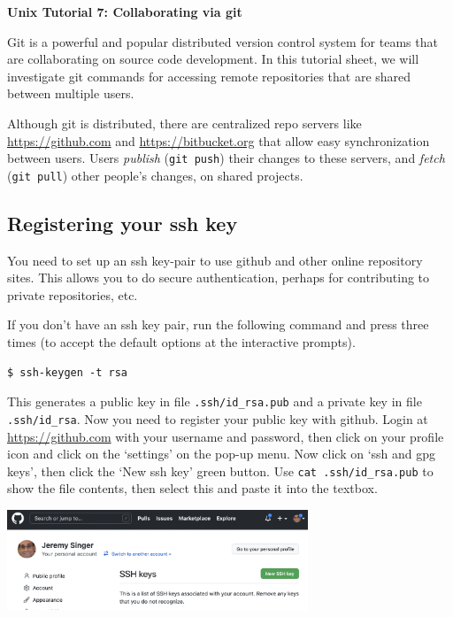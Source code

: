 \documentclass{article}
\begin{document}
\noindent
{\Large \textsf{\textbf{Unix Tutorial 7: Collaborating via git}}}

\bigskip

Git is a powerful and popular distributed version control system for teams that are collaborating on
source code development. In this tutorial sheet, we will
investigate git commands for accessing remote repositories that are
shared between multiple users.


Although git is distributed, there are centralized repo servers like \url{https://github.com} and \url{https://bitbucket.org} that
allow easy synchronization between users.
Users \emph{publish} (\texttt{git push}) their changes to these servers, and \emph{fetch} (\texttt{git pull})
other people's changes, on shared projects.

\subsection*{Registering your ssh key}

You need to set up an ssh key-pair to use github and other online repository
sites. This allows you to do secure authentication, perhaps for
contributing to private repositories, etc.

If you don't have an ssh key pair, run the following command and press
\keys{\enter} three times (to accept the default options at the interactive prompts).

\begin{lstlisting}[style=BashInputStyle]
    $ ssh-keygen -t rsa
\end{lstlisting}

This generates a public key in file \texttt{.ssh/id\_{}rsa.pub} and a private
key in file \texttt{.ssh/id\_{}rsa}. Now you need to register your public key with
github. Login at \url{https://github.com} with your username and password,
then click on your profile icon and click on the `settings' on the pop-up menu.
Now click on `ssh and gpg keys', then click the `New ssh key'  green button. Use \texttt{cat .ssh/id\_{}rsa.pub} to show the file contents, then select this and paste it into the textbox.

\begin{center}
\includegraphics[width=9cm]{github_key.png}
\end{center}
\end{document}
